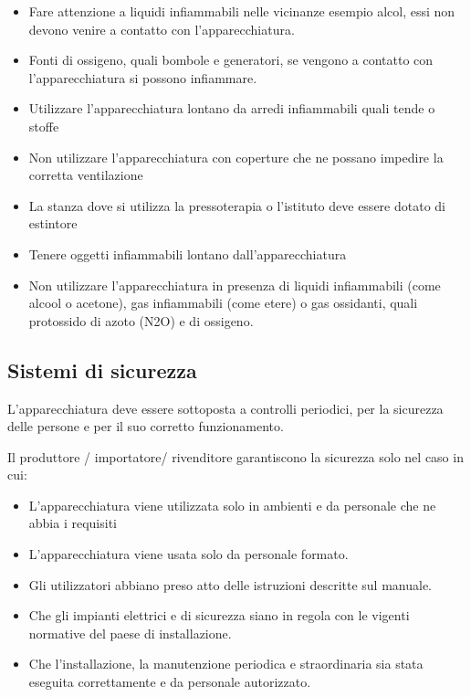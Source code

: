 \documentclass[a4paper]{article}
\begin{document}
\begin{itemize}
  \item Fare attenzione a liquidi infiammabili nelle vicinanze esempio alcol, essi non devono venire a contatto con l'apparecchiatura.
  \item Fonti di ossigeno, quali bombole e generatori, se vengono a contatto con l'apparecchiatura si possono infiammare.
  \item Utilizzare l'apparecchiatura lontano da arredi infiammabili quali tende o stoffe
  \item Non utilizzare l'apparecchiatura con coperture che ne possano impedire la corretta ventilazione
  \item La stanza dove si utilizza la pressoterapia o l'istituto deve essere dotato di estintore
  \item Tenere oggetti infiammabili lontano dall'apparecchiatura
  \item Non utilizzare l'apparecchiatura in presenza di liquidi infiammabili (come alcool o acetone), gas infiammabili (come etere) o gas ossidanti, quali protossido di azoto (N2O) e di ossigeno.
\end{itemize}

\subsection{Sistemi di sicurezza}
L'apparecchiatura deve essere sottoposta a controlli periodici, per la sicurezza delle persone e per il suo corretto funzionamento.

Il produttore / importatore/ rivenditore garantiscono la sicurezza solo nel caso in cui:

\begin{itemize}
  \item L'apparecchiatura viene utilizzata solo in ambienti e da personale che ne abbia i requisiti
  \item L'apparecchiatura viene usata solo da personale formato.
  \item Gli utilizzatori abbiano preso atto delle istruzioni descritte sul manuale.
  \item Che gli impianti elettrici e di sicurezza siano in regola con le vigenti normative del paese di installazione.
  \item Che l'installazione, la manutenzione periodica e straordinaria sia stata eseguita correttamente e da personale autorizzato.
\end{itemize}
\end{document}
